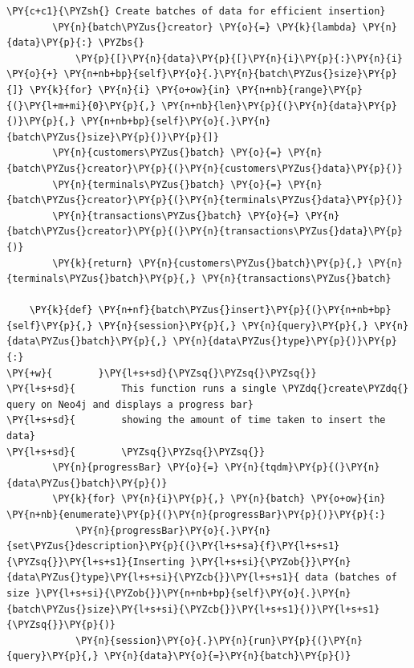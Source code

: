 \begin{tcolorbox}[breakable, size=fbox, boxrule=1pt, pad at break*=1mm,colback=cellbackground, colframe=cellborder]
\begin{Verbatim}[commandchars=\\\{\}]
        \PY{c+c1}{\PYZsh{} Create batches of data for efficient insertion}
        \PY{n}{batch\PYZus{}creator} \PY{o}{=} \PY{k}{lambda} \PY{n}{data}\PY{p}{:} \PYZbs{}
            \PY{p}{[}\PY{n}{data}\PY{p}{[}\PY{n}{i}\PY{p}{:}\PY{n}{i} \PY{o}{+} \PY{n+nb+bp}{self}\PY{o}{.}\PY{n}{batch\PYZus{}size}\PY{p}{]} \PY{k}{for} \PY{n}{i} \PY{o+ow}{in} \PY{n+nb}{range}\PY{p}{(}\PY{l+m+mi}{0}\PY{p}{,} \PY{n+nb}{len}\PY{p}{(}\PY{n}{data}\PY{p}{)}\PY{p}{,} \PY{n+nb+bp}{self}\PY{o}{.}\PY{n}{batch\PYZus{}size}\PY{p}{)}\PY{p}{]}
        \PY{n}{customers\PYZus{}batch} \PY{o}{=} \PY{n}{batch\PYZus{}creator}\PY{p}{(}\PY{n}{customers\PYZus{}data}\PY{p}{)}
        \PY{n}{terminals\PYZus{}batch} \PY{o}{=} \PY{n}{batch\PYZus{}creator}\PY{p}{(}\PY{n}{terminals\PYZus{}data}\PY{p}{)}
        \PY{n}{transactions\PYZus{}batch} \PY{o}{=} \PY{n}{batch\PYZus{}creator}\PY{p}{(}\PY{n}{transactions\PYZus{}data}\PY{p}{)}
        \PY{k}{return} \PY{n}{customers\PYZus{}batch}\PY{p}{,} \PY{n}{terminals\PYZus{}batch}\PY{p}{,} \PY{n}{transactions\PYZus{}batch}

    \PY{k}{def} \PY{n+nf}{batch\PYZus{}insert}\PY{p}{(}\PY{n+nb+bp}{self}\PY{p}{,} \PY{n}{session}\PY{p}{,} \PY{n}{query}\PY{p}{,} \PY{n}{data\PYZus{}batch}\PY{p}{,} \PY{n}{data\PYZus{}type}\PY{p}{)}\PY{p}{:}
\PY{+w}{        }\PY{l+s+sd}{\PYZsq{}\PYZsq{}\PYZsq{}}
\PY{l+s+sd}{        This function runs a single \PYZdq{}create\PYZdq{} query on Neo4j and displays a progress bar}
\PY{l+s+sd}{        showing the amount of time taken to insert the data}
\PY{l+s+sd}{        \PYZsq{}\PYZsq{}\PYZsq{}}
        \PY{n}{progressBar} \PY{o}{=} \PY{n}{tqdm}\PY{p}{(}\PY{n}{data\PYZus{}batch}\PY{p}{)}
        \PY{k}{for} \PY{n}{i}\PY{p}{,} \PY{n}{batch} \PY{o+ow}{in} \PY{n+nb}{enumerate}\PY{p}{(}\PY{n}{progressBar}\PY{p}{)}\PY{p}{:}
            \PY{n}{progressBar}\PY{o}{.}\PY{n}{set\PYZus{}description}\PY{p}{(}\PY{l+s+sa}{f}\PY{l+s+s1}{\PYZsq{}}\PY{l+s+s1}{Inserting }\PY{l+s+si}{\PYZob{}}\PY{n}{data\PYZus{}type}\PY{l+s+si}{\PYZcb{}}\PY{l+s+s1}{ data (batches of size }\PY{l+s+si}{\PYZob{}}\PY{n+nb+bp}{self}\PY{o}{.}\PY{n}{batch\PYZus{}size}\PY{l+s+si}{\PYZcb{}}\PY{l+s+s1}{)}\PY{l+s+s1}{\PYZsq{}}\PY{p}{)}
            \PY{n}{session}\PY{o}{.}\PY{n}{run}\PY{p}{(}\PY{n}{query}\PY{p}{,} \PY{n}{data}\PY{o}{=}\PY{n}{batch}\PY{p}{)}


\end{Verbatim}
\end{tcolorbox}
